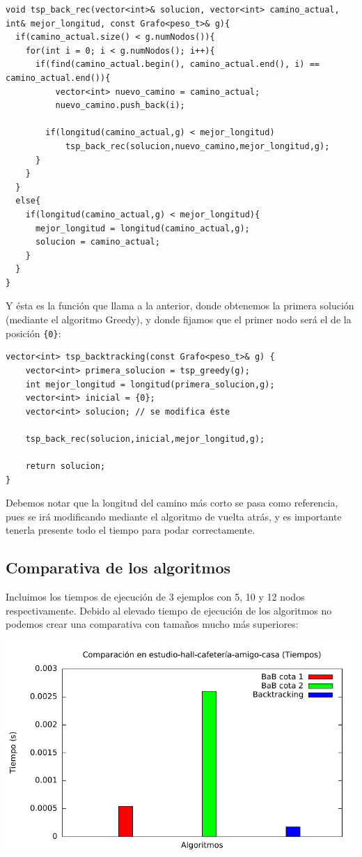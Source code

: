 \begin{lstlisting}
void tsp_back_rec(vector<int>& solucion, vector<int> camino_actual, int& mejor_longitud, const Grafo<peso_t>& g){
  if(camino_actual.size() < g.numNodos()){
    for(int i = 0; i < g.numNodos(); i++){
      if(find(camino_actual.begin(), camino_actual.end(), i) == camino_actual.end()){
	      vector<int> nuevo_camino = camino_actual;
	      nuevo_camino.push_back(i);

        if(longitud(camino_actual,g) < mejor_longitud)
	        tsp_back_rec(solucion,nuevo_camino,mejor_longitud,g);
      }
    }
  }
  else{
    if(longitud(camino_actual,g) < mejor_longitud){
      mejor_longitud = longitud(camino_actual,g);
      solucion = camino_actual;
    }
  }
}
\end{lstlisting}

Y ésta es la función que llama a la anterior, donde obtenemos la primera solución (mediante el algoritmo Greedy), y donde fijamos que el primer nodo será el de la posición \texttt{\{0\}}:

\begin{lstlisting}
vector<int> tsp_backtracking(const Grafo<peso_t>& g) {
	vector<int> primera_solucion = tsp_greedy(g);
	int mejor_longitud = longitud(primera_solucion,g);
	vector<int> inicial = {0};
	vector<int> solucion; // se modifica éste

	tsp_back_rec(solucion,inicial,mejor_longitud,g);

	return solucion;
}
\end{lstlisting}

Debemos notar que la longitud del camino más corto se pasa como referencia, pues se irá modificando mediante el algoritmo de vuelta atrás, y es importante tenerla presente todo el tiempo para podar correctamente.

\subsection{Comparativa de los algoritmos}

Incluimos los tiempos de ejecución de 3 ejemplos con 5, 10 y 12 nodos respectivamente. Debido al elevado tiempo de ejecución de los algoritmos no podemos crear una comparativa con tamaños mucho más superiores:

\includegraphics[width=15cm]{img/barras_e-h-c-a-c5_t}

